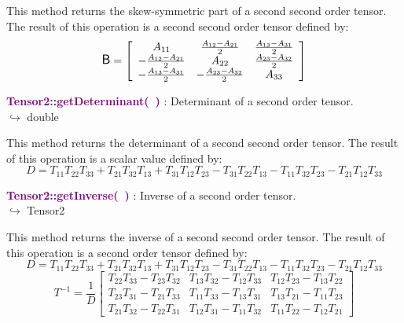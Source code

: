 This method returns the skew-symmetric part of a second second order tensor.
The result of this operation is a second second order tensor defined by:
\begin{equation*}
\mbox{\large\ensuremath{\mathsf{B}}} = \left[\begin{array}{ccc}
 A_{11} & \frac{A_{12} - A_{21}}{2} & \frac{A_{13} - A_{31}}{2}\\
 -\frac{A_{12} -  A_{21}}{2} & A_{22} & \frac {A_{23} - A_{32}}{2}\\
 -\frac{A_{13} - A_{31}}{2} & -\frac {A_{23} - A_{32}}{2} & A_{33}\end{array}
\right]
\end{equation*}

\textcolor{purple}{\textbf{Tensor2::getDeterminant(~)}}\label{Tensor2::getDeterminant()} : Determinant of a second order tensor.\\ \hspace*{5mm}$\hookrightarrow$ double

This method returns the determinant of a second second order tensor.
The result of this operation is a scalar value defined by:
\begin{equation*}
D = T_{11} T_{22} T_{33} + T_{21} T_{32} T_{13} + T_{31} T_{12} T_{23} - T_{31} T_{22} T_{13} - T_{11} T_{32} T_{23} - T_{21} T_{12} T_{33}
\end{equation*}

\textcolor{purple}{\textbf{Tensor2::getInverse(~)}}\label{Tensor2::getInverse()} : Inverse of a second order tensor.\\ \hspace*{5mm}$\hookrightarrow$ Tensor2

This method returns the inverse of a second second order tensor.
The result of this operation is a second order tensor defined by:
\begin{equation*}
D = T_{11} T_{22} T_{33} + T_{21} T_{32} T_{13} + T_{31} T_{12} T_{23} - T_{31} T_{22} T_{13} - T_{11} T_{32} T_{23} - T_{21} T_{12} T_{33}
\end{equation*}
\begin{equation*}
T^{-1} = \frac {1}{D} \left[\begin{array}{ccc}
  T_{22}T_{33}-T_{23}T_{32}&T_{13}T_{32}-T_{12}T_{33}&T_{12}T_{23}-T_{13}T_{22}\\
  T_{23}T_{31}-T_{21}T_{33}&T_{11}T_{33}-T_{13}T_{31}&T_{13}T_{21}-T_{11}T_{23}\\
  T_{21}T_{32}-T_{22}T_{31}&T_{12}T_{31}-T_{11}T_{32}&T_{11}T_{22}-T_{12}T_{21}
  \end{array}
  \right]
\end{equation*}

